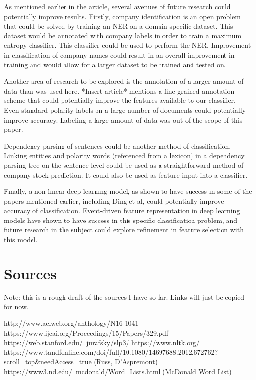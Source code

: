 \documentclass{article}
\begin{document}
    As mentioned earlier in the article, several avenues of future research could potentially improve results. Firstly, company identification is an open problem that could be solved by training an NER on a domain-specific dataset. This dataset would be annotated with company labels in order to train a maximum entropy classifier. This classifier could be used to perform the NER. Improvement in classification of company names could result in an overall improvement in training and would allow for a larger dataset to be trained and tested on. 
    
    Another area of research to be explored is the annotation of a larger amount of data than was used here. *Insert article* mentions a fine-grained annotation scheme that could potentially improve the features available to our classifier. Even standard polarity labels on a large number of documents could potentially improve accuracy. Labeling a large amount of data was out of the scope of this paper.
    
    Dependency parsing of sentences could be another method of classification. Linking entities and polarity words (referenced from a lexicon) in a dependency parsing tree on the sentence level could be used as a straightforward method of company stock prediction. It could also be used as feature input into a classifier.
    
    Finally, a non-linear deep learning model, as shown to have success in some of the papers mentioned earlier, including Ding et al, could potentially improve accuracy of classification. Event-driven feature representation in deep learning models have shown to have success in this specific classification problem, and future research in the subject could explore refinement in feature selection with this model.

\section{Sources}
        Note: this is a rough draft of the sources I have so far. Links will just be copied for now.
        
        http://www.aclweb.org/anthology/N16-1041 \newline
        https://www.ijcai.org/Proceedings/15/Papers/329.pdf \newline
        https://web.stanford.edu/~jurafsky/slp3/ \newline
        https://www.nltk.org/
        https://www.tandfonline.com/doi/full/10.1080/14697688.2012.672762?scroll=top&needAccess=true (Russ, D'Aspremont)
        https://www3.nd.edu/~mcdonald/Word_Lists.html (McDonald Word List)
    
\end{document}
